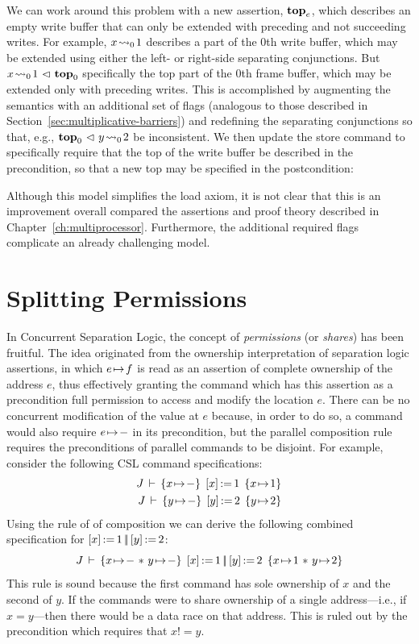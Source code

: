 \documentclass[11pt]{report}
\begin{document}
We can work around this problem with a new assertion, $\mathbf{top}_{e}$, which describes an empty write buffer that can only be extended with preceding and not succeeding writes. For example, $x \!\leadsto_{0}\! 1$ describes a part of the 0th write buffer, which may be extended using either the left- or right-side separating conjunctions. But $x \!\leadsto_{0}\! 1 \operatorname{\,\vartriangleleft\,} \mathbf{top}_{0}$ specifically the top part of the 0th frame buffer, which may be extended only with preceding writes. This is accomplished by augmenting the semantics with an additional set of flags (analogous to those described in Section~\ref{sec:multiplicative-barriers}) and redefining the separating conjunctions so that, e.g., $\mathbf{top}_{0} \operatorname{\,\vartriangleleft\,} y \!\leadsto_{0}\! 2$ be inconsistent. We then update the store command to specifically require that the top of the write buffer be described in the precondition, so that a new top may be specified in the postcondition: 

Although this model simplifies the load axiom, it is not clear that this is an improvement overall compared the assertions and proof theory described in Chapter~\ref{ch:multiprocessor}. Furthermore, the additional required flags complicate an already challenging model. 

\section{Splitting Permissions} 
\label{sec:splitting-permissions}

In Concurrent Separation Logic, the concept of \emph{permissions} (or \emph{shares}) has been fruitful. The idea originated from the ownership interpretation of separation logic assertions, in which $e \!\mapsto\! f$ is read as an assertion of complete ownership of the address $e$, thus effectively granting the command which has this assertion as a precondition full permission to access and modify the location $e$. There can be no concurrent modification of the value at $e$ because, in order to do so, a command would also require $e \!\mapsto\! -$ in its precondition, but the parallel composition rule requires the preconditions of parallel commands to be disjoint. For example, consider the following CSL command specifications: \begin{align*}
  \spec{J}{x \fpointsto -}{\cstore{x}{1}}{x \fpointsto 1} \\ 
  \spec{J}{y \fpointsto -}{\cstore{y}{2}}{y \fpointsto 2}
\end{align*}Using the rule of of composition we can derive the following combined specification for $\left[ x \right] \operatorname{:\!=} 1 \operatorname{|\!|} \left[ y \right] \operatorname{:\!=} 2$: \[ \spec{J}{x \fpointsto - \fsep y \fpointsto -}{\cstore{x}{1} \oppar \cstore{y}{2}}{x \fpointsto 1 \fsep y \fpointsto 2} \] This rule is sound because the first command has sole ownership of $x$ and the second of $y$. If the commands were to share ownership of a single address---i.e., if $x = y$---then there would be a data race on that address. This is ruled out by the precondition which requires that $x != y$. 
\end{document}
